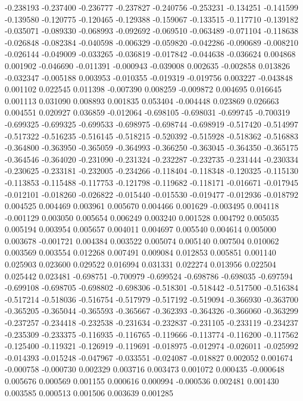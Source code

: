 -0.238193
-0.237400
-0.236777
-0.237827
-0.240756
-0.253231
-0.134251
-0.141599
-0.139580
-0.120775
-0.120465
-0.129388
-0.159067
-0.133515
-0.117710
-0.139182
-0.035071
-0.089330
-0.068993
-0.092692
-0.069510
-0.063489
-0.071104
-0.118638
-0.026848
-0.082384
-0.040598
-0.006329
-0.059820
-0.042286
-0.090689
-0.008210
-0.026144
-0.049009
-0.033265
-0.036819
-0.017842
-0.044638
-0.036624
0.004868
0.001902
-0.046690
-0.011391
-0.000943
-0.039008
0.002635
-0.002858
0.013826
-0.032347
-0.005188
0.003953
-0.010355
-0.019319
-0.019756
0.003227
-0.043848
0.001102
0.022545
0.011398
-0.007390
0.008259
-0.009872
0.004695
0.016645
0.001113
0.031090
0.008893
0.001835
0.053404
-0.004448
0.023869
0.026663
0.004551
0.020927
0.036859
-0.012064
-0.698105
-0.698031
-0.699745
-0.700319
-0.699325
-0.699325
-0.699533
-0.698975
-0.698744
-0.698919
-0.517420
-0.514997
-0.517322
-0.516235
-0.516145
-0.518215
-0.520392
-0.515928
-0.518362
-0.516883
-0.364800
-0.363950
-0.365059
-0.364993
-0.366250
-0.363045
-0.364350
-0.365175
-0.364546
-0.364020
-0.231090
-0.231324
-0.232287
-0.232735
-0.231444
-0.230334
-0.230625
-0.233181
-0.232005
-0.234266
-0.118404
-0.118348
-0.120325
-0.115130
-0.113853
-0.115488
-0.117753
-0.121798
-0.119682
-0.118171
-0.016671
-0.017945
-0.012101
-0.018260
-0.026822
-0.015440
-0.015530
-0.019477
-0.012936
-0.018792
0.004525
0.004469
0.003961
0.005670
0.004466
0.001629
-0.003495
0.004118
-0.001129
0.003050
0.005654
0.006249
0.003240
0.001528
0.004792
0.005035
0.005194
0.003954
0.005657
0.004011
0.004697
0.005540
0.004614
0.005000
0.003678
-0.001721
0.004384
0.003522
0.005074
0.005140
0.007504
0.010062
0.003569
0.003554
0.012268
0.007491
0.009084
0.012853
0.005851
0.001140
0.025903
0.023600
0.029522
0.016994
0.031331
0.022274
0.013956
0.022504
0.025442
0.023481
-0.698751
-0.700979
-0.699524
-0.698786
-0.698035
-0.697594
-0.699108
-0.698705
-0.698802
-0.698306
-0.518301
-0.518442
-0.517500
-0.516384
-0.517214
-0.518036
-0.516754
-0.517979
-0.517192
-0.519094
-0.366930
-0.363700
-0.365205
-0.365044
-0.365593
-0.365667
-0.362393
-0.364326
-0.366060
-0.363299
-0.237257
-0.234418
-0.232538
-0.231634
-0.232837
-0.231105
-0.233119
-0.234237
-0.235309
-0.233375
-0.116935
-0.116765
-0.119666
-0.113774
-0.116200
-0.117562
-0.125400
-0.119321
-0.126919
-0.119691
-0.018975
-0.012974
-0.026011
-0.025992
-0.014393
-0.015248
-0.047967
-0.033551
-0.024087
-0.018827
0.002052
0.001674
-0.000758
-0.000730
0.002329
0.003716
0.003473
0.001072
0.000435
-0.000648
0.005676
0.000569
0.001155
0.000616
0.000994
-0.000536
0.002481
0.001430
0.003585
0.000513
0.001506
0.003639
0.001285

